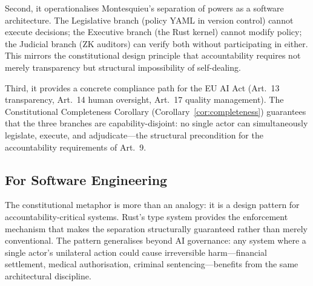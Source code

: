 Second, it operationalises Montesquieu's separation of powers as a
software architecture. The Legislative branch (policy YAML in version
control) cannot execute decisions; the Executive branch (the Rust
kernel) cannot modify policy; the Judicial branch (ZK auditors) can
verify both without participating in either. This mirrors the
constitutional design principle that accountability requires not merely
transparency but structural impossibility of self-dealing.

Third, it provides a concrete compliance path for the EU AI Act
(Art.~13 transparency, Art.~14 human oversight, Art.~17 quality
management). The Constitutional Completeness Corollary
(Corollary~\ref{cor:completeness}) guarantees that the three branches
are capability-disjoint: no single actor can simultaneously legislate,
execute, and adjudicate---the structural precondition for the
accountability requirements of Art.~9.

\subsection{For Software Engineering}

The constitutional metaphor is more than an analogy: it is a design
pattern for accountability-critical systems. Rust's type system
provides the enforcement mechanism that makes the separation
structurally guaranteed rather than merely conventional. The pattern
generalises beyond AI governance: any system where a single actor's
unilateral action could cause irreversible harm---financial settlement,
medical authorisation, criminal sentencing---benefits from the same
architectural discipline.
